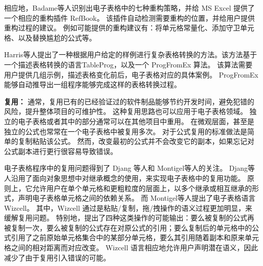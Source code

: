 相应地，Badame等人\cite{badame2012refactoring}识别出电子表格中的七种重构策略，并给 MS Excel 提供了一个相应的重构插件 RefBook。
该插件自动检测需要重构的位置，并给用户提供重构过程的建议。
例如可能提供的重构建议有：将单元格常量化、添加守卫单元格、以及替换尴尬的公式等。

Harris等人\cite{harris2011spreadsheet}提出了一种根据用户给定的样例进行复杂表格转换的方法。该方法基于一个描述表格转换的语言TableProg，以及一个 ProgFromEx 算法。 
该算法需要用户提供几组示例，描述表格变化前后，电子表格对应的具体案例。
ProgFromEx 能够自动推导出一组程序能够完成这样的表格转换过程。

\textbf{复用：}
通常，复用已有的已经验证过的软件制品能够节约开发时间，避免犯错的风险，提升整体项目的可维护性\cite{ye2005reuse}。
这种复用思路也可以应用于电子表格领域。
独立的电子表格或者其中的部分通常可以在其他项目中重用。
在微观层面，甚至是独立的公式也常常在一个电子表格中被复用多次。
对于公式复用的标准做法是简单的复制粘贴该公式。
然而，改变最初的公式并不会改变它的副本，如果忘记对公式副本进行更行很容易导致错误。

电子表格程序中的复用问题得到了 Djang 等人\cite{djang1998similarity}和 Montigel等人\cite{montigel2002portability}的关注。
Djang等人\cite{djang1998similarity}沿用了面向对象思想中对继承概念的使用，来实现电子表格中的复用功能。
原则上，它允许用户在单个单元格和更粗粒度的层面上，以多个继承或相互继承的形式，声明电子表格单元格之间的依赖关系。
而 Montigel等人\cite{montigel2002portability}提出了电子表格语言 Wizcell。
其中，Wizcell 通过是粘贴/复制，拖/拽操作的语义过程更加明显，来缓解复用问题。
特别地，提出了四种这类操作的可能输出：要么被复制的公式再被复制一次，要么被复制的公式存在对原公式的引用；要么复制后的单元格中的公式引用了之前原始单元格集合中的某部分单元格，要么其引用随着副本和原来单元格之间的相对距离而对应改变。
Wizcell 语言相应地允许用户声明潜在语义，因此减少了由于复用引入错误的可能。